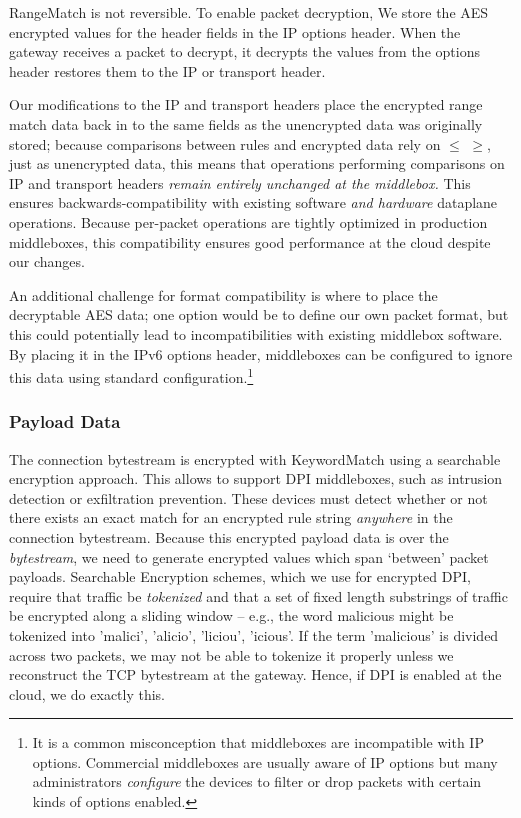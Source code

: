  RangeMatch is not reversible. To enable packet decryption, We store the AES encrypted values for the header fields in the IP options header. When the gateway receives a packet to decrypt, it decrypts the values from the options header restores them to the IP or transport header.

Our modifications to the IP and transport headers place the encrypted range match data back in to the same fields as the unencrypted data was originally stored; because comparisons between rules and encrypted data rely on $\leq$ $\geq$, just as unencrypted data, this means that operations performing comparisons on IP and transport headers {\it remain entirely unchanged at the middlebox.}
This ensures backwards-compatibility with existing software {\it and hardware} dataplane operations.
Because per-packet operations are tightly optimized in production middleboxes, this compatibility ensures good performance at the cloud despite our changes.

An additional challenge for format compatibility is where to place the decryptable AES data; one option would be to define our own packet format, but this could potentially lead to incompatibilities with existing middlebox software. By placing it in the IPv6 options header, middleboxes can be configured to ignore this data using standard configuration.\footnote{It is a common misconception that middleboxes are incompatible with IP options. Commercial middleboxes are usually aware of IP options but many administrators {\it configure} the devices to filter or drop packets with certain kinds of options enabled.}


\subsubsection{Payload Data} 
The connection bytestream is encrypted with KeywordMatch using a searchable encryption approach.
This allows \sys to support DPI middleboxes, such as intrusion detection or exfiltration prevention.
These devices must detect whether or not there exists an exact match for an encrypted rule string {\it anywhere} in the connection bytestream.
Because this encrypted payload data is over the {\it bytestream}, we need to generate encrypted values which span `between' packet payloads. 
Searchable Encryption schemes, which we use for encrypted DPI, require that traffic be {\it tokenized} and that a set of fixed length substrings of traffic be encrypted along a sliding window -- e.g., the word malicious might be tokenized into {'malici', 'alicio', 'liciou', 'icious'}.
If the term 'malicious' is divided across two packets, we may not be able to tokenize it properly unless we reconstruct the TCP bytestream at the gateway. Hence, if DPI is enabled at the cloud, we do exactly this.

